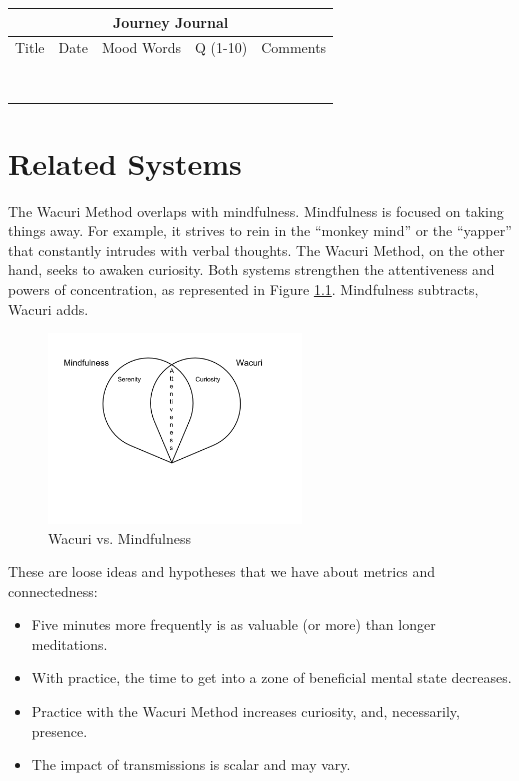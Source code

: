 \documentclass[12pt]{book}
\begin{document}
\begin{tabular}{ |p{2cm}||p{2cm}|p{3cm}|p{1cm}|p{5cm}|  }
 \hline
 \multicolumn{5}{|c|}{Journey Journal} \\
 \hline
 Title& Date & Mood Words & Q (1-10) & Comments\\
  \hline
 \hline
 & & & & \\
 \hline 
 & & & & \\
 \hline 
 & & & & \\
 \hline 
 & & & & \\
 \hline 
 & & & & \\
 \hline 
 & & & & \\
 \hline 
 & & & & \\
 \hline 
  & & & & \\
 \hline
  \hline
\end{tabular}



\chapter{Related Systems}

The Wacuri Method overlaps with mindfulness.  Mindfulness is focused
on taking things away. For example, it strives to rein in the
``monkey mind'' or the ``yapper'' that constantly intrudes with
verbal thoughts. The Wacuri Method, on the other hand, seeks
to awaken curiosity. Both systems strengthen the attentiveness
and powers of concentration, as represented in Figure \ref{fig:wacurivsmindfulness}. Mindfulness subtracts, Wacuri adds.

\begin{figure}
  \centering
     \includegraphics[width=0.6\textwidth]{WacuriFigures/WacuriMindfulnessDiagram.png}
     \caption{Wacuri vs. Mindfulness}
  \label{fig:wacurivsmindfulness}     
\end{figure}

These are loose ideas and hypotheses that we have about metrics and connectedness:
\begin{itemize}
\item Five minutes more frequently is as valuable (or more) than longer meditations.
\item With practice, the time to get into a zone of beneficial mental state decreases.
\item Practice with the Wacuri Method increases curiosity, and, necessarily, presence.
  \item The impact of transmissions is scalar and may vary.
  \end{itemize}
\end{document}
